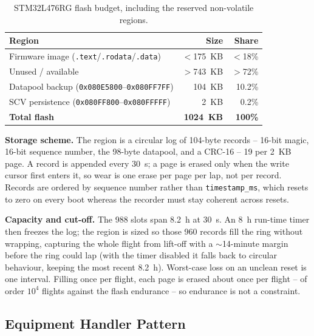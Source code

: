 \begin{table}[H]
\centering
\begin{tabular}{lrr}
\toprule
\textbf{Region} & \textbf{Size} & \textbf{Share} \\
\midrule
Firmware image (\texttt{.text}/\texttt{.rodata}/\texttt{.data})   & $<$175~KB & $<$18\% \\
Unused / available                                                & $>$743~KB & $>$72\% \\
Datapool backup (\texttt{0x080E5800}--\texttt{0x080FF7FF})        & 104~KB       & 10.2\% \\
SCV persistence (\texttt{0x080FF800}--\texttt{0x080FFFFF})        & 2~KB         & 0.2\% \\
\midrule
\textbf{Total flash}                                              & \textbf{1024~KB} & \textbf{100\%} \\
\bottomrule
\end{tabular}
\caption{STM32L476RG flash budget, including the reserved non-volatile regions.}
\label{tab:cdh-nvm-budget}
\end{table}

\textbf{Storage scheme.} The region is a circular log of 104-byte records --
16-bit magic, 16-bit sequence number, the 98-byte datapool, and a CRC-16 -- 19
per 2~KB page. A record is appended every 30~s; a page is erased only when the
write cursor first enters it, so wear is one erase per page per lap, not per
record. Records are ordered by sequence number rather than
\texttt{timestamp\_ms}, which resets to zero on every boot whereas the recorder
must stay coherent across resets.

\textbf{Capacity and cut-off.} The 988 slots span 8.2~h at 30~s. An 8~h
run-time timer then freezes the log; the region is sized so those 960 records
fill the ring without wrapping, capturing the whole flight from lift-off with a
$\sim$14-minute margin before the ring could lap (with the timer disabled it
falls back to circular behaviour, keeping the most recent 8.2~h). Worst-case
loss on an unclean reset is one interval. Filling once per flight, each page is
erased about once per flight -- of order $10^{4}$ flights against the flash
endurance -- so endurance is not a constraint.

\subsection{Equipment Handler Pattern}
\label{sec:cdh-handlers}

